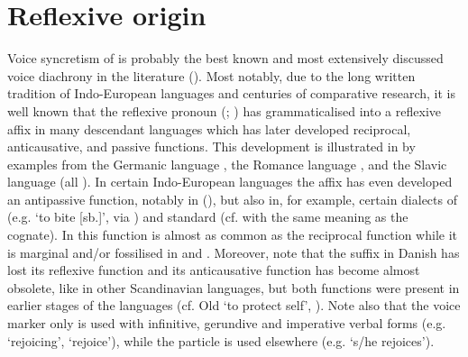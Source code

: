 \section{Reflexive origin} \label{diachrony:reflexive}
Voice syncretism of  is probably the best known and most extensively discussed voice diachrony in the literature (\citealt{haspelmath:1990, haspelmath:2003, kemmer:1993, heine:2000, heine:kuteva:2002, heine:miyashita:2008, maslova:2008, janic:2010, sanso:2017, sanso:2018}). Most notably, due to the long written tradition of Indo-European languages and centuries of comparative research, it is well known that the  reflexive pronoun  (\citealt[397]{kulikov:2010}; \citeyear[276]{kulikov:2013}) has grammaticalised into a reflexive affix in many descendant languages which has later developed reciprocal, anticausative, and passive functions. This development is illustrated in  by examples from the Germanic language , the Romance language , and the Slavic language  (all ). In certain Indo-European languages the affix has even developed an antipassive function, notably in  (), but also in, for example, certain dialects of  (e.g.  ‘to bite [sb.]’, \citealt[62]{berkov:1985} via \citealt[297]{nedjalkov:2007d}) and standard  (cf.  with the same meaning as the  cognate). In  this function is almost as common as the reciprocal function \citep[681]{knjazev:2007} while it is marginal and/or fossilised in  and . Moreover, note that the suffix  in Danish has lost its reflexive function and its anticausative function has become almost obsolete, like in other Scandinavian languages, but both functions were present in earlier stages of the languages (cf. Old   ‘to protect self’, \citealt[203]{ottosson:2008}). Note also that the  voice marker  only is used with infinitive, gerundive and imperative verbal forms (e.g.  ‘rejoicing’,  ‘rejoice’), while the particle  is used elsewhere (e.g.  ‘s/he rejoices’).

